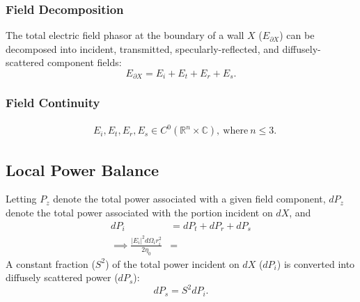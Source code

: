 \documentclass{article}
\begin{document}
\subsubsection{Field Decomposition}
The total electric field phasor at the boundary of a wall $X$ ($E_{\partial X}$) can
be decomposed into incident, transmitted, specularly-reflected, and
diffusely-scattered component fields:
\begin{equation}
   E_{\partial X} = E_i + E_t + E_r + E_s.
   \label{eq:fieldDecomposition}
\end{equation}
\subsubsection{Field Continuity}
\begin{align}
   &E_i, E_t, E_r, E_s \in C^0( \mathbb{R}^n \times \mathbb{C} ), \ \text{where} \ n
      \leq 3. 
   \label{eq:fieldContinuity}
\end{align}
\vspace{-\belowdisplayskip} 
\vspace{-\parskip}
\setcounter{equation}{0}
\subsection{Local Power Balance}
Letting $P_z$ denote the total power associated with a given field component, $dP_z$
denote the total power associated with the portion incident on $dX$, and 
\begin{align}
   dP_i &= dP_t + dP_r + dP_s \nonumber \\
   \implies \frac{|E_i|^2 d \Omega_i r_i^2}{2 \eta_0} &= \nonumber
\end{align}
A constant fraction ($S^2$) of the total power incident on $dX$ ($dP_i$) is converted
into diffusely scattered power ($dP_s$): 
\begin{equation}
   dP_s = S^2 dP_i.
   \label{eq:sDef}
\end{equation}
\end{document}

